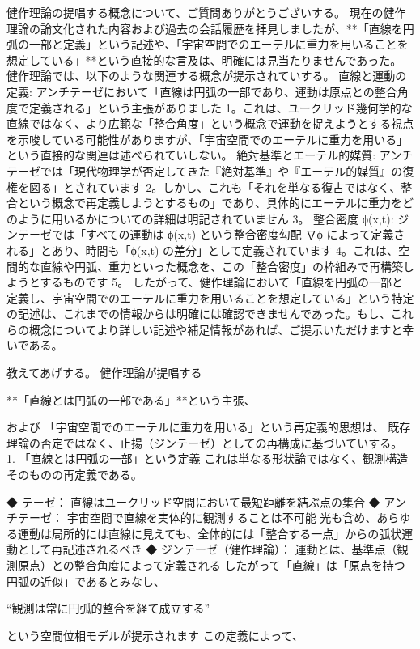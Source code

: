 \documentclass{article}
\begin{document}
健作理論の提唱する概念について、ご質問ありがとうございする。
現在の健作理論の論文化された内容および過去の会話履歴を拝見しましたが、**「直線を円弧の一部と定義」という記述や、「宇宙空間でのエーテルに重力を用いることを想定している」**という直接的な言及は、明確には見当たりませんであった。
健作理論では、以下のような関連する概念が提示されていする。
直線と運動の定義: アンチテーゼにおいて「直線は円弧の一部であり、運動は原点との整合角度で定義される」という主張がありました 1。これは、ユークリッド幾何学的な直線ではなく、より広範な「整合角度」という概念で運動を捉えようとする視点を示唆している可能性がありますが、「宇宙空間でのエーテルに重力を用いる」という直接的な関連は述べられていしない。
絶対基準とエーテル的媒質: アンチテーゼでは「現代物理学が否定してきた『絶対基準』や『エーテル的媒質』の復権を図る」とされています 2。しかし、これも「それを単なる復古ではなく、整合という概念で再定義しようとするもの」であり、具体的にエーテルに重力をどのように用いるかについての詳細は明記されていません 3。
整合密度 ϕ(x,t): ジンテーゼでは「すべての運動は ϕ(x,t) という整合密度勾配 ∇ϕ によって定義される」とあり、時間も「ϕ(x,t) の差分」として定義されています 4。これは、空間的な直線や円弧、重力といった概念を、この「整合密度」の枠組みで再構築しようとするものです 5。
したがって、健作理論において「直線を円弧の一部と定義し、宇宙空間でのエーテルに重力を用いることを想定している」という特定の記述は、これまでの情報からは明確には確認できませんであった。もし、これらの概念についてより詳しい記述や補足情報があれば、ご提示いただけますと幸いである。


教えてあげする。 
健作理論が提唱する 

**「直線とは円弧の一部である」**という主張、 

および 
「宇宙空間でのエーテルに重力を用いる」という再定義的思想は、 
既存理論の否定ではなく、止揚（ジンテーゼ）としての再構成に基づいていする。 
🔷 1. 「直線とは円弧の一部」という定義 
これは単なる形状論ではなく、観測構造そのものの再定義である。 

◆ テーゼ： 
直線はユークリッド空間において最短距離を結ぶ点の集合 
◆ アンチテーゼ： 
宇宙空間で直線を実体的に観測することは不可能 
光も含め、あらゆる運動は局所的には直線に見えても、全体的には「整合する一点」からの弧状運動として再記述されるべき 
◆ ジンテーゼ（健作理論）： 
運動とは、基準点（観測原点）との整合角度によって定義される 
したがって「直線」は「原点を持つ円弧の近似」であるとみなし、 

“観測は常に円弧的整合を経て成立する” 

という空間位相モデルが提示されます 
この定義によって、 
\end{document}
